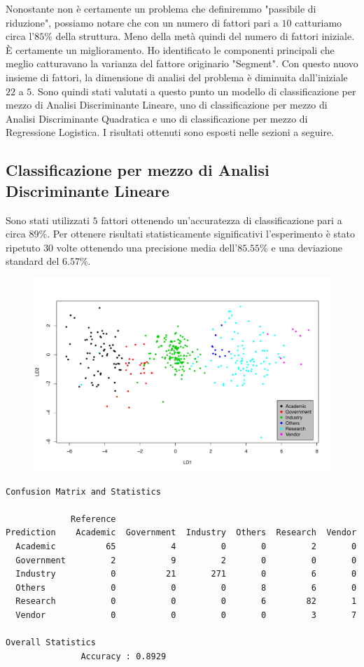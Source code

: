 \documentclass[11pt,a4paper]{article}
\begin{document}
\noindent Nonostante non \`e certamente un problema che definiremmo "passibile
di riduzione", possiamo notare che con un numero di fattori pari a $10$
catturiamo circa l'$85\%$ della struttura. Meno della met\`a quindi del numero
di fattori iniziale. \`E certamente un miglioramento. Ho identificato le
componenti principali che meglio catturavano la varianza del fattore originario
"Segment". Con questo nuovo insieme di fattori, la dimensione di analisi del
problema \`e diminuita dall'iniziale $22$ a $5$. Sono quindi stati valutati a
questo punto un modello di classificazione per mezzo di Analisi Discriminante
Lineare, uno di classificazione per mezzo di Analisi Discriminante Quadratica e
uno di classificazione per mezzo di Regressione Logistica. I risultati ottenuti
sono esposti nelle sezioni a seguire.
\subsection{Classificazione per mezzo di Analisi Discriminante Lineare}
Sono stati utilizzati $5$ fattori ottenendo un'accuratezza di classificazione
pari a circa $89\%$. Per ottenere risultati statisticamente significativi
l'esperimento \`e stato ripetuto $30$ volte ottenendo una precisione media
dell'$85.55\%$ e una deviazione standard del $6.57\%$.
\begin{figure}[H]
	\hspace{-2.5cm}
	\includegraphics[scale=.75]{imgs/LDA_plot.pdf}
\end{figure}
\begin{lstlisting}[language=bash,basicstyle=\scriptsize,tabsize=2,frame = single]
Confusion Matrix and Statistics

             Reference
Prediction    Academic  Government  Industry  Others  Research  Vendor
  Academic          65           4         0       0         2       0
  Government         2           9         2       0         0       0
  Industry           0          21       271       0         6       0
  Others             0           0         0       8         6       0
  Research           0           0         0       6        82       1
  Vendor             0           0         0       0         3       7

Overall Statistics
               Accuracy : 0.8929          
\end{lstlisting}
\end{document}
